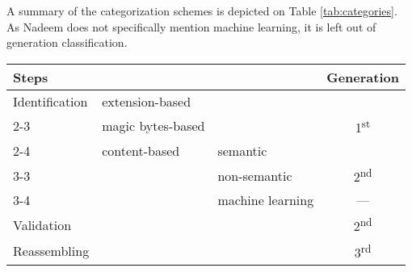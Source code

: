 A summary of the categorization schemes is depicted on Table \ref{tab:categories}. As Nadeem \cite{nadeem_ashraf_forensic_2013} does not specifically mention machine learning, it is left out of generation classification.

\begin{table*}[!ht]
    \centering
    \caption{Data carving categories}
    \label{tab:categories}
    \begin{tabular}{ l | l | l | c }
      \multicolumn{3}{l|}{Steps}                                 & Generation\\
      \hline\hline
      Identification    & extension-based   &                   &   \\
                        \cline{2-3}
                        & magic bytes-based &                   & \multirow{-2}{*}{1\textsuperscript{st}}\\
                        \cline{2-4}
                        & content-based     & semantic          &   \\
                                            \cline{3-3}
                        &                   & non-semantic      & \multirow{-2}{*}{2\textsuperscript{nd}}\\
                                            \cline{3-4}
                        &                   & machine learning  &  --- \\
      \hline
      Validation        &                   &                   & 2\textsuperscript{nd} \\
      \hline
      Reassembling      &                   &                   & 3\textsuperscript{rd}\\
      \hline
    \end{tabular}
\end{table*}
